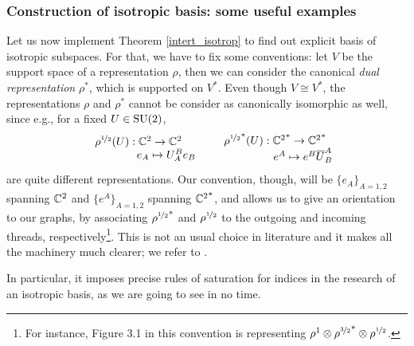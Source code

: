 \subsubsection{Construction of isotropic basis: some useful examples}

Let us now implement Theorem \ref{intert_isotrop} to find out explicit basis of isotropic subspaces. For that, we have to fix some conventions: let $V$ be the support space of a representation $\rho$, then we can consider the canonical \emph{dual representation} $\rho^*$, which is supported on $V^*$. Even though $V\cong V^*$, the representations $\rho$ and $\rho^*$ cannot be consider as canonically isomorphic as well, since e.g., for a fixed $U\in\text{\normalfont SU}(2)$,
$$\begin{matrix}
    \rho^{\nicefrac{1}{2}}(U):\mathbb{C}^2\to\mathbb{C}^2\\
    \qquad\qquad\quad e_A\mapsto U_A^Be_B
\end{matrix}\qquad\begin{matrix}
    {\rho^{\nicefrac{1}{2}}}^*(U):{\mathbb{C}^2}^*\to{\mathbb{C}^2}^*\\
    \qquad\qquad\quad e^A\mapsto e^B\overline{U}_B^A
\end{matrix}$$
are quite different representations. Our convention, though, will be $\{e_A\}_{A=1,2}$ spanning $\mathbb{C}^2$ and $\{e^A\}_{A=1,2}$ spanning ${\mathbb{C}^2}^*$, and allows us to give an orientation to our graphs, by associating ${\rho^{\nicefrac{1}{2}}}^*$ and $\rho^{\nicefrac{1}{2}}$ to the outgoing and incoming threads, respectively\footnote{For instance, Figure 3.1 in this convention is representing $\rho^1\otimes{\rho^{\nicefrac{3}{2}}}^*\otimes\rho^{\nicefrac{1}{2}}$.}. This is not an usual choice in literature and it makes all the machinery much clearer; we refer to \cite{LN6}. 

In particular, it imposes precise rules of saturation for indices in the research of an isotropic basis, as we are going to see in no time.

